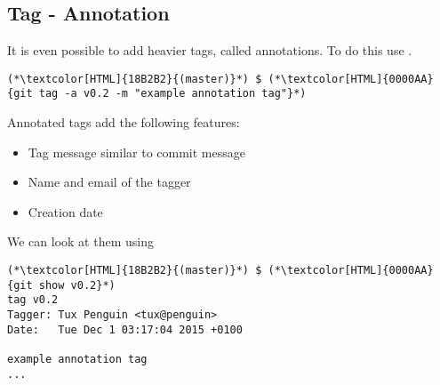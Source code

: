 \subsection{Tag - Annotation}
\begin{frame}[fragile]
  \subslidetitle
  It is even possible to add heavier tags, called annotations. To do this use .

  \begin{lstlisting}
(*\textcolor[HTML]{18B2B2}{(master)}*) $ (*\textcolor[HTML]{0000AA}{git tag -a v0.2 -m "example annotation tag"}*)
\end{lstlisting}

  Annotated tags add the following features:
  \begin{itemize}
    \item Tag message similar to commit message
    \item Name and email of the tagger
    \item Creation date
  \end{itemize}

  We can look at them using 
  \begin{lstlisting}
(*\textcolor[HTML]{18B2B2}{(master)}*) $ (*\textcolor[HTML]{0000AA}{git show v0.2}*)
tag v0.2
Tagger: Tux Penguin <tux@penguin>
Date:   Tue Dec 1 03:17:04 2015 +0100

example annotation tag
...
\end{lstlisting}

\end{frame}

